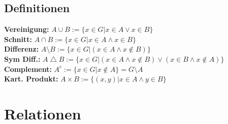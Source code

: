 \documentclass[8pt,landscape]{scrartcl}
\begin{document}
\begin{multicols}{3}
\subsection{Definitionen}
\textbf{Vereinigung:} $A \cup B := \{ x \in G | x \in A \lor x \in B \}$\\
\textbf{Schnitt:}     $A \cap B := \{ x \in G | x \in A \land x \in B \}$\\
\textbf{Differenz:}   $A \setminus B := \{x \in G | (x \in A \land x \not\in B) \}$\\
\textbf{Sym Diff.:}   $A \bigtriangleup B := \{x \in G | (x \in A \land x \not \in B) \lor (x \in B \land x \not \in A) \}$\\
\textbf{Complement:}  $A^c := \{x \in G | x \not \in A \} = G \setminus A$\\
\textbf{Kart. Produkt:} $A \times B := \{ (x, y) | x \in A \land y \in B \}$\\










\section{Relationen}


\end{multicols}
\end{document}
